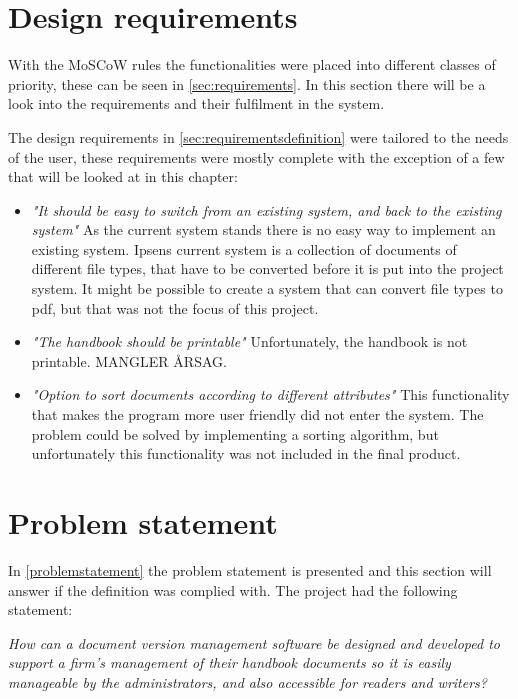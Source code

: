\section{Design requirements}
With the MoSCoW rules the functionalities were placed into different classes of priority, these can be seen in \cref{sec:requirements}. In this section there will be a look into the requirements and their fulfilment in the system.

The design requirements in \cref{sec:requirementsdefinition} were tailored to the needs of the user, these requirements were mostly complete with the exception of a few that will be looked at in this chapter:

\begin{itemize}
	\item \textit{"It should be easy to switch from an existing system, and back to the existing system"}
	As the current system stands there is no easy way to implement an existing system. Ipsens current system is a collection of documents of different file types, that have to be converted before it is put into the project system. It might be possible to create a system that can convert file types to pdf, but that was not the focus of this project.
	\item \textit{"The handbook should be printable"}
	Unfortunately, the handbook is not printable. MANGLER ÅRSAG. 
	\item \textit{"Option to sort documents according to different attributes"}
	This functionality that makes the program more user friendly did not enter the system. The problem could be solved by implementing a sorting algorithm, but unfortunately this functionality was not included in the final product.
\end{itemize}

\section{Problem statement}
In \cref{problemstatement} the problem statement is presented and this section will answer if the definition was complied with. The project had the following statement:

\begin{center}
\textit{How can a document version management software be designed and developed to support a firm's management of their handbook documents so it is easily manageable by the administrators, and also accessible for readers and writers?}
\end{center}

